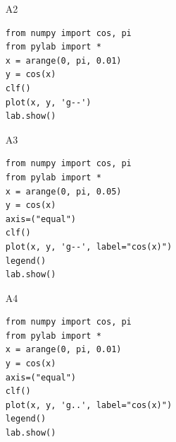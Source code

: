 \begin{enumerate}
\begin{enumerate}
\item[A2] 
\begin{verbatim}
from numpy import cos, pi
from pylab import *
x = arange(0, pi, 0.01)
y = cos(x)
clf()
plot(x, y, 'g--')
lab.show()
\end{verbatim}
\item[A3] 
\begin{verbatim}
from numpy import cos, pi
from pylab import *
x = arange(0, pi, 0.05)
y = cos(x)
axis=("equal")
clf()
plot(x, y, 'g--', label="cos(x)")
legend()
lab.show()
\end{verbatim}
\item[A4] 
\begin{verbatim}
from numpy import cos, pi
from pylab import *
x = arange(0, pi, 0.01)
y = cos(x)
axis=("equal")
clf()
plot(x, y, 'g..', label="cos(x)")
legend()
lab.show()
\end{verbatim}
\end{enumerate}
\end{enumerate}

